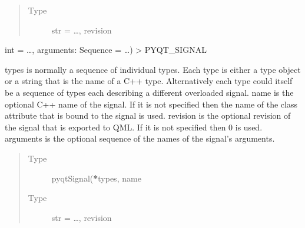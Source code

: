 \documentclass[letterpaper,10pt,english]{sphinxmanual}
\begin{document}
\begin{fulllineitems}
\begin{fulllineitems}
\begin{quote}
\begin{description}
\item[{Type}] \leavevmode
\sphinxAtStartPar
str = …, revision

\end{description}\end{quote}

\end{fulllineitems}


\begin{fulllineitems}
\label{\detokenize{NoSeMazeController/Windows:Windows.AppWindows.HardwareWindow.save_preferences}}
\pysigstartsignatures
{}
\pysigstopsignatures
\end{fulllineitems}


\begin{fulllineitems}
\label{\detokenize{NoSeMazeController/Windows:Windows.AppWindows.HardwareWindow.saved}}
\pysigstartsignatures
{}
\pysigstopsignatures
\sphinxAtStartPar
int = …, arguments: Sequence = …) \sphinxhyphen{}\textgreater{} PYQT\_SIGNAL

\sphinxAtStartPar
types is normally a sequence of individual types.  Each type is either a
type object or a string that is the name of a C++ type.  Alternatively
each type could itself be a sequence of types each describing a different
overloaded signal.
name is the optional C++ name of the signal.  If it is not specified then
the name of the class attribute that is bound to the signal is used.
revision is the optional revision of the signal that is exported to QML.
If it is not specified then 0 is used.
arguments is the optional sequence of the names of the signal’s arguments.
\begin{quote}\begin{description}
\item[{Type}] \leavevmode
\sphinxAtStartPar
pyqtSignal({\color{red}\bfseries{}*}types, name

\item[{Type}] \leavevmode
\sphinxAtStartPar
str = …, revision

\end{description}\end{quote}


\end{fulllineitems}
\end{fulllineitems}
\end{document}
